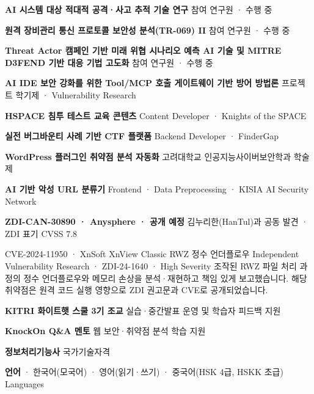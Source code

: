 \newpage


  {\textbf{AI 시스템 대상 적대적 공격·사고 추적 기술 연구}}
  {참여 연구원 · 수행 중}

  {\textbf{원격 장비관리 통신 프로토콜 보안성 분석(TR-069) II}}
  {참여 연구원 · 수행 중}

  {\textbf{Threat Actor 캠페인 기반 미래 위협 시나리오 예측 AI 기술 및 MITRE D3FEND 기반 대응 기법 고도화}}
  {참여 연구원 · 수행 중}

  {\textbf{AI IDE 보안 강화를 위한 Tool/MCP 호출 게이트웨이 기반 방어 방법론}}
  {프로젝트 학기제 · Vulnerability Research}

  {\textbf{HSPACE 침투 테스트 교육 콘텐츠}}
  {Content Developer · Knights of the SPACE}

  {\textbf{실전 버그바운티 사례 기반 CTF 플랫폼}}
  {Backend Developer · FinderGap}

  {\textbf{WordPress 플러그인 취약점 분석 자동화}}
  {고려대학교 인공지능사이버보안학과 학술제}

  {\textbf{AI 기반 악성 URL 분류기}}
  {Frontend · Data Preprocessing · KISIA AI Security Network}


  {\textbf{ZDI-CAN-30890 · Anysphere · 공개 예정}}
  {김누리한(HanTul)과 공동 발견 · ZDI 표기 CVSS 7.8}

  {CVE-2024-11950 · XnSoft XnView Classic RWZ 정수 언더플로우}
  {Independent Vulnerability Research · ZDI-24-1640 · High Severity}
  {조작된 RWZ 파일 처리 과정의 정수 언더플로우와 메모리 손상을 분석·재현하고 책임 있게 보고했습니다.
   해당 취약점은 원격 코드 실행 영향으로 ZDI 권고문과 CVE로 공개되었습니다.}


  {\textbf{KITRI 화이트햇 스쿨 3기 조교}}
  {실습·중간발표 운영 및 학습자 피드백 지원}

  {\textbf{KnockOn Q\&A 멘토}}
  {웹 보안·취약점 분석 학습 지원}

  {\textbf{정보처리기능사}}
  {국가기술자격}

\compactentry{}
  {\textbf{언어} · 한국어(모국어) · 영어(읽기·쓰기) · 중국어(HSK 4급, HSKK 초급)}
  {Languages}



